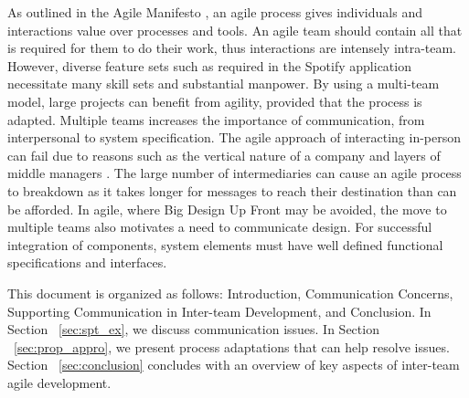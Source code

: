 As outlined in the Agile Manifesto \cite{beck2001agile}, an agile process gives individuals and interactions value over processes and tools.
An agile team should contain all that is required for them to do their work, thus interactions are intensely intra-team.
However, diverse feature sets such as required in the Spotify application necessitate many skill sets and substantial manpower.
By using a multi-team model, large projects can benefit from agility, provided that the process is adapted.
Multiple teams increases the importance of communication, from interpersonal to system specification. 
The agile approach of interacting in-person can fail due to reasons such as the vertical nature of a company and layers of middle managers \cite{dzone_article}.
The large number of intermediaries can cause an agile process to breakdown as it takes longer for messages to reach their destination than can be afforded.
In agile, where Big Design Up Front may be avoided, the move to multiple teams also motivates a need to communicate design. %
For successful integration of components, system elements must have well defined functional specifications and interfaces.


This document is organized as follows: Introduction, Communication Concerns, Supporting Communication in Inter-team Development, and Conclusion. 
In Section ~\ref{sec:spt_ex}, we discuss communication issues.
In Section ~\ref{sec:prop_appro}, we present process adaptations that can help resolve issues.
Section ~\ref{sec:conclusion} concludes with an overview of key aspects of inter-team agile development.



